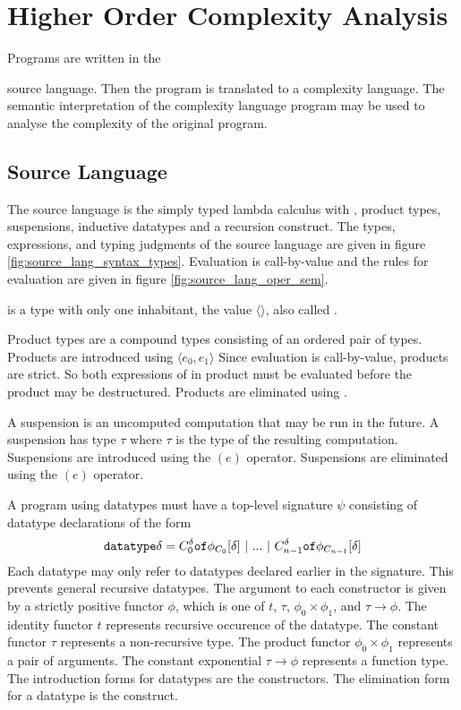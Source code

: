 \chapter{Higher Order Complexity Analysis}

Programs are written in the {source language.
Then the program is translated to a complexity language.
The semantic interpretation of the complexity language program may be used to analyse the complexity of the original program.

\section{Source Language}
The source language is the simply typed lambda calculus with , product types, suspensions, inductive datatypes and a recursion construct.
The types, expressions, and typing judgments of the source language are given in figure \ref{fig:source_lang_syntax_types}.  
Evaluation is call-by-value and the rules for evaluation are given in figure \ref{fig:source_lang_oper_sem}.

 is a type with only one inhabitant, the value $\langle\rangle$, also called .

Product types are a compound types consisting of an ordered pair of types.
Products are introduced using $\langle e_0, e_1 \rangle$
Since evaluation is call-by-value, products are strict.
So both expressions of in product must be evaluated before the product may be destructured.
Products are eliminated using .

A suspension is an uncomputed computation that may be run in the future.
A suspension has type  $\tau$ where $\tau$ is the type of the resulting computation.
Suspensions are introduced using the $(e)$ operator.
Suspensions are eliminated using the $(e)$ operator.


A program using datatypes must have a top-level signature $\psi$ consisting of datatype declarations of the form
\[ \texttt{datatype} \delta = C^\delta_0 \texttt{of} \phi_{C_0}[\delta] \ |\ ...\ |\ C^\delta_{n-1} \texttt{of} \phi_{C_{n-1}}[\delta] \]
Each datatype may only refer to datatypes declared earlier in the signature. This prevents general recursive datatypes.
The argument to each constructor is given by a strictly positive functor $\phi$, which is one of $t$, $\tau$, $\phi_0 \times \phi_1$, and $\tau \rightarrow \phi$.
The identity functor $t$ represents recursive occurence of the datatype.
The constant functor $\tau$ represents a non-recursive type.
The product functor $\phi_0 \times \phi_1$ represents a pair of arguments.
The constant exponential $\tau \rightarrow \phi$ represents a function type.
The introduction forms for datatypes are the constructors.
The elimination form for a datatype is the  construct.


}
